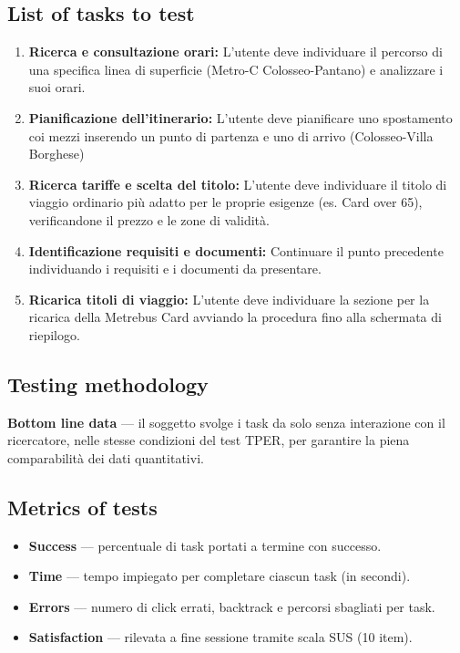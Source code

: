 \documentclass[11pt,a4paper]{article}
\begin{document}
\subsection*{List of tasks to test}
\begin{tcolorbox}[colback=backgroundColor,colframe=borderColor,arc=2mm]
\begin{enumerate}[leftmargin=*,itemsep=4pt]
  \item \textbf{Ricerca e consultazione orari:} L'utente
  deve individuare il percorso di una specifica linea di superficie (Metro-C Colosseo-Pantano) e analizzare i suoi orari.
  \item \textbf{Pianificazione dell'itinerario:} L'utente
  deve pianificare uno spostamento coi mezzi inserendo un punto di partenza e
  uno di arrivo (Colosseo-Villa Borghese)
  \item \textbf{Ricerca tariffe e scelta del titolo:}
  L'utente deve individuare il titolo di viaggio ordinario
  più adatto per le proprie esigenze (es. Card over 65),
  verificandone il prezzo e le zone di validità.
  \item \textbf{Identificazione requisiti e documenti:}
  Continuare il punto precedente individuando i requisiti e i documenti
  da presentare.
  \item \textbf{Ricarica titoli di viaggio:}
  L'utente deve individuare la sezione per la ricarica della Metrebus Card
  avviando la procedura fino alla schermata di riepilogo.
\end{enumerate}
\end{tcolorbox}

\vspace{0.4cm}

\subsection*{Testing methodology}
\textbf{Bottom line data} --- il
soggetto svolge i task da solo senza interazione con
il ricercatore, nelle stesse condizioni del test TPER,
per garantire la piena comparabilità dei dati quantitativi.

\vspace{0.2cm}

\subsection*{Metrics of tests}
\begin{itemize}[leftmargin=*,itemsep=3pt]
  \item \textbf{Success} --- percentuale di task portati
  a termine con successo.
  \item \textbf{Time} --- tempo impiegato per
  completare ciascun task (in secondi).
  \item \textbf{Errors} --- numero di click errati,
  backtrack e percorsi sbagliati per task.
  \item \textbf{Satisfaction} --- rilevata a fine sessione
  tramite scala SUS (10 item).
\end{itemize}
\end{document}
